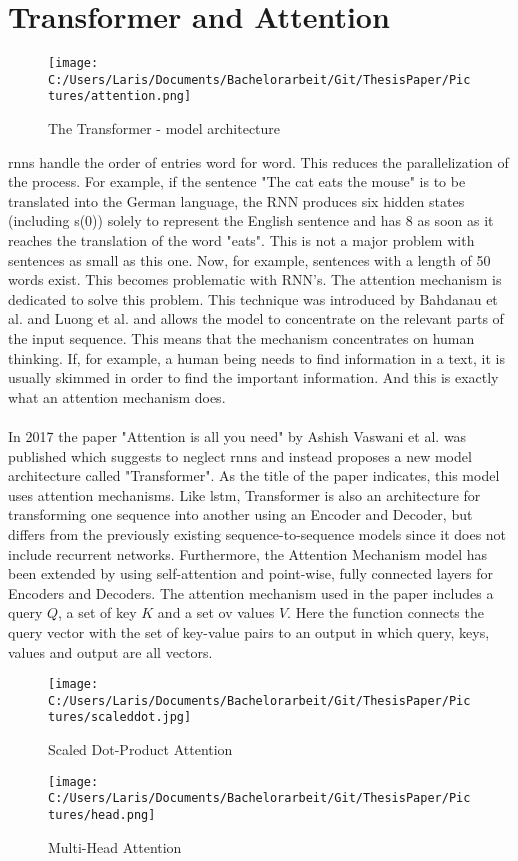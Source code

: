 \documentclass[a4paper, 11pt,titlepage,oneside,openany]{book}
\begin{document}
\section{Transformer and Attention}
\begin{figure}[h]
	\centering
	\texttt{[image: C:/Users/Laris/Documents/Bachelorarbeit/Git/ThesisPaper/Pictures/attention.png]}
	\caption{The Transformer - model architecture \cite{attention}}
\end{figure}
\noindent \gls{rnn}s handle the order of entries word for word. This reduces the parallelization of the process. For example, if the sentence "The cat eats the mouse" is to be translated into the German language, the RNN produces six hidden states (including s(0)) solely to represent the English sentence and has 8 as soon as it reaches the translation of the word "eats". This is not a major problem with sentences as small as this one. Now, for example, sentences with a length of 50 words exist. This becomes problematic with RNN's. The attention mechanism is dedicated to solve this problem. This technique was introduced by Bahdanau et al. \cite{bahdnau} and Luong et al. \cite{lunong} and allows the model to concentrate on the relevant parts of the input sequence. This means that the mechanism concentrates on human thinking. If, for example, a human being needs to find information in a text, it is usually skimmed in order to find the important information. And this is exactly what an attention mechanism does. \\
\\In 2017 the paper "Attention is all you need" by Ashish Vaswani et al.  \cite{attention} was published which suggests to neglect \gls{rnn}s and instead proposes a new model architecture called "Transformer". As the title of the paper indicates, this model uses attention mechanisms. Like \gls{lstm}, Transformer is also an architecture for transforming one sequence into another using an Encoder and Decoder, but differs from the previously existing sequence-to-sequence models since it does not include recurrent networks. Furthermore, the Attention Mechanism model has been extended by using self-attention and point-wise, fully connected layers for Encoders and Decoders.
The attention mechanism used in the paper includes a query $Q$, a set of key $K$ and a set ov values $V$. Here the function connects the query vector with the set of key-value pairs to an output in which query, keys, values and output are all vectors.\\
\begin{figure}[t]
	\begin{minipage}[b]{0.5\linewidth}
		\texttt{[image: C:/Users/Laris/Documents/Bachelorarbeit/Git/ThesisPaper/Pictures/scaleddot.jpg]}
		\caption{Scaled Dot-Product Attention}
	\end{minipage}
	\hfill
	\begin{minipage}[b]{0.5\linewidth}
		\texttt{[image: C:/Users/Laris/Documents/Bachelorarbeit/Git/ThesisPaper/Pictures/head.png]}
		\caption{Multi-Head Attention}
	\end{minipage}
\end{figure}
\end{document}
